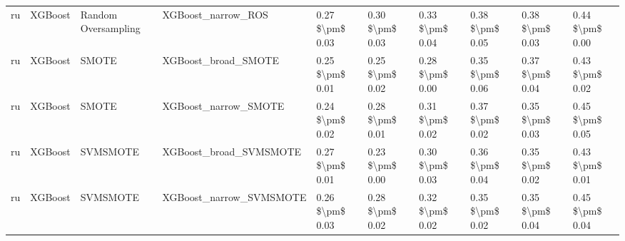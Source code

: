 \begin{tabular}{llllllllll}
      ru &                         XGBoost &           Random Oversampling &                           XGBoost\_narrow\_ROS & 0.27 \$\textbackslash pm\$ 0.03 &           0.30 \$\textbackslash pm\$ 0.03 &       0.33 \$\textbackslash pm\$ 0.04 &        0.38 \$\textbackslash pm\$ 0.05 &                         0.38 \$\textbackslash pm\$ 0.03 &     0.44 \$\textbackslash pm\$ 0.00 \\
      ru &                         XGBoost &                         SMOTE &                          XGBoost\_broad\_SMOTE & 0.25 \$\textbackslash pm\$ 0.01 &           0.25 \$\textbackslash pm\$ 0.02 &       0.28 \$\textbackslash pm\$ 0.00 &        0.35 \$\textbackslash pm\$ 0.06 &                         0.37 \$\textbackslash pm\$ 0.04 &     0.43 \$\textbackslash pm\$ 0.02 \\
      ru &                         XGBoost &                         SMOTE &                         XGBoost\_narrow\_SMOTE & 0.24 \$\textbackslash pm\$ 0.02 &           0.28 \$\textbackslash pm\$ 0.01 &       0.31 \$\textbackslash pm\$ 0.02 &        0.37 \$\textbackslash pm\$ 0.02 &                         0.35 \$\textbackslash pm\$ 0.03 &     0.45 \$\textbackslash pm\$ 0.05 \\
      ru &                         XGBoost &                      SVMSMOTE &                       XGBoost\_broad\_SVMSMOTE & 0.27 \$\textbackslash pm\$ 0.01 &           0.23 \$\textbackslash pm\$ 0.00 &       0.30 \$\textbackslash pm\$ 0.03 &        0.36 \$\textbackslash pm\$ 0.04 &                         0.35 \$\textbackslash pm\$ 0.02 &     0.43 \$\textbackslash pm\$ 0.01 \\
      ru &                         XGBoost &                      SVMSMOTE &                      XGBoost\_narrow\_SVMSMOTE & 0.26 \$\textbackslash pm\$ 0.03 &           0.28 \$\textbackslash pm\$ 0.02 &       0.32 \$\textbackslash pm\$ 0.02 &        0.35 \$\textbackslash pm\$ 0.02 &                         0.35 \$\textbackslash pm\$ 0.04 &     0.45 \$\textbackslash pm\$ 0.04 \\
\bottomrule
\end{tabular}

